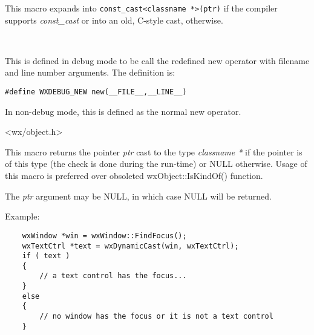 This macro expands into {\tt const\_cast<classname *>(ptr)} if the compiler
supports {\it const\_cast} or into an old, C-style cast, otherwise.


\\

\label{debugnew}


This is defined in debug mode to be call the redefined new operator
with filename and line number arguments. The definition is:

\begin{verbatim}
#define WXDEBUG_NEW new(__FILE__,__LINE__)
\end{verbatim}

In non-debug mode, this is defined as the normal new operator.


<wx/object.h>

\label{wxdynamiccast}


This macro returns the pointer {\it ptr} cast to the type {\it classname *} if
the pointer is of this type (the check is done during the run-time) or NULL
otherwise. Usage of this macro is preferred over obsoleted wxObject::IsKindOf()
function.

The {\it ptr} argument may be NULL, in which case NULL will be returned.

Example:

\begin{verbatim}
    wxWindow *win = wxWindow::FindFocus();
    wxTextCtrl *text = wxDynamicCast(win, wxTextCtrl);
    if ( text )
    {
        // a text control has the focus...
    }
    else
    {
        // no window has the focus or it is not a text control
    }
\end{verbatim}


\\
\\

\label{wxiconmacro}


